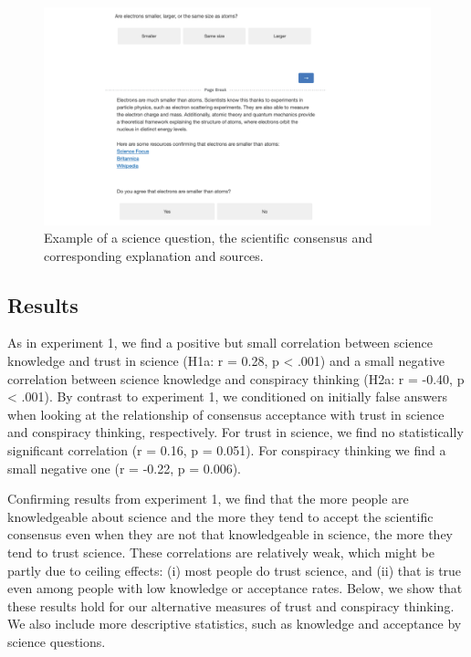 \documentclass[
  doc,floatsintext]{apa6}
\begin{document}
\begin{figure}

\includegraphics[width=1\linewidth]{./figures/study2_question_example} \hfill{}

\caption{Example of a science question, the scientific consensus and corresponding explanation and sources.}\label{fig:exp2-stimulus-example}
\end{figure}

\subsection{Results}\label{results-2}

As in experiment 1, we find a positive but small correlation between science knowledge and trust in science (H1a: r = 0.28, p \textless{} .001) and a small negative correlation between science knowledge and conspiracy thinking (H2a: r = -0.40, p \textless{} .001). By contrast to experiment 1, we conditioned on initially false answers when looking at the relationship of consensus acceptance with trust in science and conspiracy thinking, respectively. For trust in science, we find no statistically significant correlation (r = 0.16, p = 0.051). For conspiracy thinking we find a small negative one (r = -0.22, p = 0.006).

Confirming results from experiment 1, we find that the more people are knowledgeable about science and the more they tend to accept the scientific consensus even when they are not that knowledgeable in science, the more they tend to trust science. These correlations are relatively weak, which might be partly due to ceiling effects: (i) most people do trust science, and (ii) that is true even among people with low knowledge or acceptance rates. Below, we show that these results hold for our alternative measures of trust and conspiracy thinking. We also include more descriptive statistics, such as knowledge and acceptance by science questions.
\end{document}
